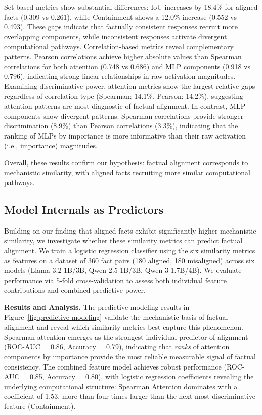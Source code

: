 \documentclass[11pt]{article}
\newcommand{\rparagraph}[1]{\vspace{1.2mm}\noindent\textbf{#1}}
\begin{document}
Set-based metrics show substantial differences: IoU increases by 18.4\% for aligned facts (0.309 vs 0.261), while Containment shows a 12.0\% increase (0.552 vs 0.493). These gaps indicate that factually consistent responses recruit more overlapping components, while inconsistent responses activate divergent computational pathways. Correlation-based metrics reveal complementary patterns. Pearson correlations achieve higher absolute values than Spearman correlations for both attention (0.748 vs 0.686) and MLP components (0.918 vs 0.796), indicating strong linear relationships in raw activation magnitudes. Examining discriminative power, attention metrics show the largest relative gaps regardless of correlation type (Spearman: 14.1\%, Pearson: 14.2\%), suggesting attention patterns are most diagnostic of factual alignment. In contrast, MLP components show divergent patterns: Spearman correlations provide stronger discrimination (8.9\%) than Pearson correlations (3.3\%), indicating that the ranking of MLPs by importance is more informative than their raw activation (i.e., importance)  magnitudes.


Overall, these results confirm our hypothesis: factual alignment corresponds to mechanistic similarity, with aligned facts recruiting more similar computational pathways.

\subsection{Model Internals as Predictors}

Building on our finding that aligned facts exhibit significantly higher mechanistic similarity, we investigate whether these similarity metrics can predict factual alignment. We train a logistic regression classifier using the six similarity metrics as features on a dataset of 360 fact pairs (180 aligned, 180 misaligned) across six models (Llama-3.2 1B/3B, Qwen-2.5 1B/3B, Qwen-3 1.7B/4B). We evaluate performance via 5-fold cross-validation to assess both individual feature contributions and combined predictive power.

\rparagraph{Results and Analysis.}
The predictive modeling results in Figure~\ref{fig:predictive-modeling} validate the mechanistic basis of factual alignment and reveal which similarity metrics best capture this phenomenon. Spearman attention emerges as the strongest individual predictor of alignment (ROC-AUC = 0.86, Accuracy = 0.79), indicating that \textit{ranks} of attention components by importance provide the most reliable measurable signal of factual consistency. The combined feature model achieves robust performance (ROC-AUC = 0.85, Accuracy = 0.80), with logistic regression coefficients revealing the underlying computational structure: Spearman Attention dominates with a coefficient of 1.53, more than four times larger than the next most discriminative feature (Containment).
\end{document}
